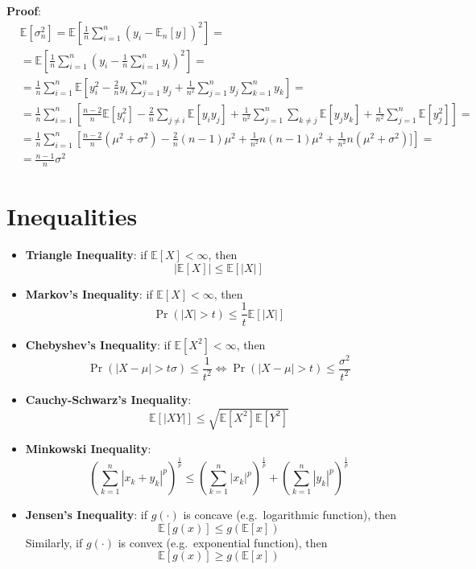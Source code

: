 \documentclass[12pt,]{book}
\providecommand{\tightlist}{%
  \setlength{\itemsep}{0pt}\setlength{\parskip}{0pt}}
\begin{document}
\textbf{Proof}:
\[
  \begin{aligned}
  &\mathbb{E}[\sigma^2_n] =  \mathbb{E} \left[ \frac{1}{n} \sum _ {i=1}^n \left( y_i - \mathbb{E}_n [y] \right)^2 \right] = 
  \\
  &= \mathbb{E} \left[ \frac{1}{n} \sum _ {i=1}^n \left( y_i - \frac{1}{n} \sum _ {i=1}^n y_i \right )^2 \right] = 
    \\
    &= \frac{1}{n} \sum _ {i=1}^n \mathbb{E} \left[ y_i^2 - \frac{2}{n} y_i \sum _ {j=1}^n y_j + \frac{1}{n^2} \sum _ {j=1}^n y_j \sum _ {k=1}^{n}y_k  \right] = 
    \\
    &= \frac{1}{n} \sum _ {i=1}^n  \left[ \frac{n-2}{n} \mathbb{E}[y_i^2]  - \frac{2}{n} \sum _ {j\neq i} \mathbb{E}[y_i y_j] + \frac{1}{n^2} \sum _ {j=1}^n \sum _ {k\neq j} \mathbb{E}[y_j y_k] + \frac{1}{n^2} \sum _ {j=1}^n \mathbb{E}[y_j^2] \right] = 
    \\
    &= \frac{1}{n} \sum _ {i=1}^n  \left[ \frac{n-2}{n}(\mu^2 + \sigma^2) - \frac{2}{n} (n-1) \mu^2 + \frac{1}{n^2} n(n-1)\mu^2 + \frac{1}{n^2} n (\mu^2 + \sigma^2)]\right] =
    \\
    &= \frac{n-1}{n} \sigma^2
    \end{aligned}
\]
\[\tag*{$\blacksquare$}\]

\hypertarget{inequalities}{%
\section{Inequalities}\label{inequalities}}

\begin{itemize}
\tightlist
\item
  \textbf{Triangle Inequality}: if \(\mathbb{E}[X] < \infty\), then
  \[ |\mathbb{E} [X] | \leq \mathbb{E} [|X|] \]
\item
  \textbf{Markov's Inequality}: if \(\mathbb{E}[X] < \infty\), then
  \[ \Pr(|X| > t) \leq \frac{1}{t} \mathbb{E}[|X|] \]
\item
  \textbf{Chebyshev's Inequality}: if \(\mathbb{E}[X^2] < \infty\), then
  \[ \Pr(|X- \mu|> t \sigma) \leq \frac{1}{t^2}\Leftrightarrow \Pr(|X- \mu|> t ) \leq \frac{\sigma^2}{t^2} \]
\item
  \textbf{Cauchy-Schwarz's Inequality}:
  \[ \mathbb{E} [|XY|] \leq \sqrt{\mathbb{E}[X^2] \mathbb{E}[Y^2]} \]
\item
  \textbf{Minkowski Inequality}:
  \[ \left( \sum _ {k=1}^n | x_k + y_k |^p \right) ^ {\frac{1}{p}} \leq \left( \sum _ {k=1}^n | x_k |^p \right) ^ {\frac{1}{p}} + \left( \sum _ {k=1}^n | y_k | ^p \right) ^ { \frac{1}{p} } \]
\item
  \textbf{Jensen's Inequality}: if \(g( \cdot)\) is concave (e.g.~logarithmic function), then
  \[ \mathbb{E}[g(x)] \leq g(\mathbb{E}[x]) \]
  Similarly, if \(g(\cdot)\) is convex (e.g.~exponential function), then
  \[ \mathbb{E}[g(x)] \geq g(\mathbb{E}[x]) \]
\end{itemize}
\end{document}
